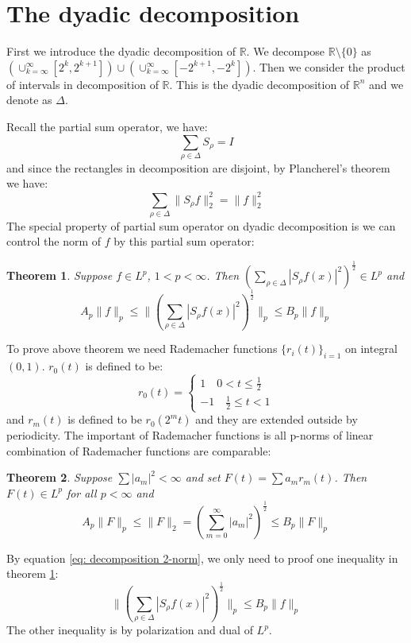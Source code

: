 \documentclass{report}
\theoremstyle{definition}
\theoremstyle{definition}
\theoremstyle{plain}
\newtheorem{theorem}{Theorem}
\numberwithin{theorem}{section}
\numberwithin{remark}{section}
\numberwithin{equation}{section}
\newcommand{\norm}[1]{\lVert#1\rVert}
\newcommand{\abs}[1]{\left\lvert#1\right\rvert}
\begin{document}
\section{The dyadic decomposition}
First we introduce the dyadic decomposition of $\mathbb{R}$. We decompose $\mathbb{R}\setminus \{0\}$ as $(\cup_{k=\infty}^\infty [2^k,2^{k+1}])\cup(\cup_{k=\infty}^\infty [-2^{k+1},-2^k])$. Then we consider the product of intervals in decomposition of $\mathbb{R}$. This is the dyadic decomposition of $\mathbb{R}^n$ and we denote as $\Delta$.\par
Recall the partial sum operator, we have:
\begin{equation*}
    \sum_{\rho\in \Delta}S_{\rho}=I
\end{equation*}
and since the rectangles in decomposition are disjoint, by Plancherel's theorem we have:
\begin{equation}\label{eq: decomposition 2-norm}
    \sum_{\rho\in \Delta}\norm{S_{\rho}f}_2^2=\norm{f}_2^2
\end{equation}
The special property of partial sum operator on dyadic decomposition is we can control the norm of $f$ by this partial sum operator:
\begin{theorem}\label{thm: dyadic decomposition}
    Suppose $f\in L^p$, $1<p<\infty$. Then $\left( \sum_{\rho\in \Delta}\abs{S_{\rho}f(x)}^2 \right)^\frac{1}{2}\in L^p$ and
    \begin{equation*}
        A_p\norm{f}_p\leq \norm{( \sum_{\rho\in \Delta}\abs{S_{\rho}f(x)}^2)^\frac{1}{2}}_p\leq B_p\norm{f}_p
    \end{equation*}
\end{theorem}
To prove above theorem we need Rademacher functions $\{r_i(t)\}_{i=1}$ on integral $(0,1)$. $r_0(t)$ is defined to be:
\begin{equation*}
    r_0(t)=
    \left\{\begin{aligned}
        1\quad 0<t\leq \frac{1}{2}\\
        -1\quad \frac{1}{2}\leq t< 1
    \end{aligned}\right.
\end{equation*} 
and $r_m(t)$ is defined to be $r_0(2^mt)$ and they are extended outside by periodicity. The important of Rademacher functions is all p-norms of linear combination of Rademacher functions are comparable:
\begin{theorem}
    Suppose $\sum\abs{a_m}^2<\infty$ and set $F(t)=\sum a_mr_m(t)$. Then $F(t)\in L^p$ for all $p<\infty$ and
\begin{equation*}
    A_p\norm{F}_p\leq\norm{F}_2=\left( \sum_{m=0}^\infty\abs{a_m}^2 \right)^{\frac{1}{2}}\leq B_p\norm{F}_p
\end{equation*}
\end{theorem}
By equation \eqref{eq: decomposition 2-norm}, we only need to proof one inequality in theorem \ref{thm: dyadic decomposition}:
\begin{equation*}
    \norm{( \sum_{\rho\in \Delta}\abs{S_{\rho}f(x)}^2)^\frac{1}{2}}_p\leq B_p\norm{f}_p
\end{equation*}
The other inequality is by polarization and dual of $L^p$.
\end{document}
